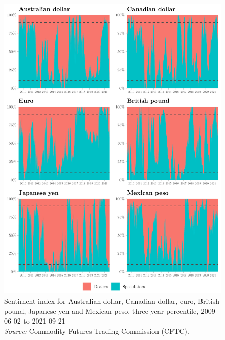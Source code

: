 \documentclass[a4paper, twoside]{templates/ociamthesis}
\begin{document}
\clearpage

\begin{figure}[!ht]

{\centering \includegraphics[width=0.99\columnwidth]{figure/OTHERCUR_1} 

}

\caption[Sentiment index for Australian dollar, Canadian dollar, euro, British pound, Japanese yen and Mexican peso, three-year percentile, 2009-06-02 to 2021-09-21]{Sentiment index for Australian dollar, Canadian dollar, euro, British pound, Japanese yen and Mexican peso, three-year percentile, 2009-06-02 to 2021-09-21 \\ \scriptsize \textit{Source:} Commodity Futures Trading Commission (CFTC).}\label{fig:FigureA36}
\end{figure}

\clearpage
\end{document}
